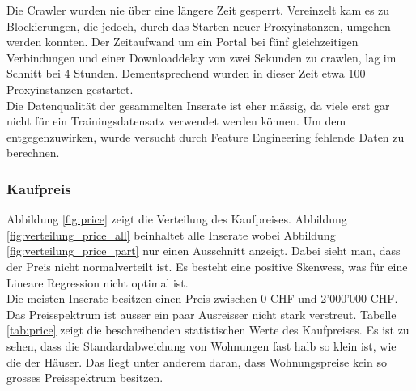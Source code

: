 \newline
%
Die Crawler wurden nie über eine längere Zeit gesperrt. Vereinzelt kam es zu Blockierungen, die jedoch, durch das Starten neuer Proxyinstanzen, umgehen werden konnten. Der Zeitaufwand um ein Portal bei fünf gleichzeitigen Verbindungen und einer Downloaddelay von zwei Sekunden zu crawlen, lag im Schnitt bei 4 Stunden. Dementsprechend wurden in dieser Zeit etwa 100 Proxyinstanzen gestartet.\\[2ex]
%
Die Datenqualität der gesammelten Inserate ist eher mässig, da viele erst gar nicht für ein Trainingsdatensatz verwendet werden können. Um dem entgegenzuwirken, wurde versucht durch Feature Engineering fehlende Daten zu berechnen.
%
\subsubsection{Kaufpreis}
Abbildung \ref{fig:price} zeigt die Verteilung des Kaufpreises. Abbildung \ref{fig:verteilung_price_all} beinhaltet alle Inserate wobei Abbildung \ref{fig:verteilung_price_part} nur einen Ausschnitt anzeigt. Dabei sieht man, dass der Preis nicht normalverteilt ist. Es besteht eine positive Skenwess, was für eine Lineare Regression nicht optimal ist.\\
Die meisten Inserate besitzen einen Preis zwischen 0 CHF und 2'000'000 CHF. Das Preisspektrum ist ausser ein paar Ausreisser nicht stark verstreut. 
Tabelle \ref{tab:price} zeigt die beschreibenden statistischen Werte des Kaufpreises. Es ist zu sehen, dass die Standardabweichung von Wohnungen fast halb so klein ist, wie die der Häuser. Das liegt unter anderem daran, dass Wohnungspreise kein so grosses Preisspektrum besitzen.
%
